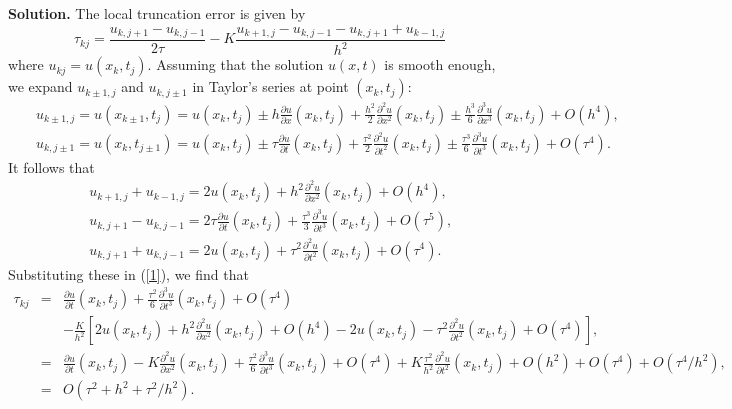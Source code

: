 \documentclass[10pt]{article}
\def\pr{{\partial}}
\begin{document}
\vskip 0.5cm \noindent
{\bf Solution.} The local truncation error is given by
\begin{equation}
\tau_{kj}=\frac{u_{k,j+1}-u_{k,j-1}}{2\tau}-K \frac{u_{k+1,j}
-u_{k,j-1}-u_{k,j+1}+u_{k-1,j}}{h^{2}}  \label{s1}
\end{equation}
where $u_{kj}=u(x_{k},t_{j})$. Assuming that the
solution $u(x,t)$ is smooth enough, we expand $u_{k\pm 1,j}$ and
$u_{k,j\pm 1}$ in Taylor's series at point $(x_{k},t_{j})$:
\begin{eqnarray}
&&u_{k\pm 1,j}=u(x_{k\pm 1},t_{j})=u(x_{k},t_{j})\pm h\frac{\pr
u}{\pr x}(x_{k},t_{j}) + \frac{h^{2}}{2}\frac{\pr^{2} u}{\pr
x^{2}}(x_{k},t_{j})\pm
\frac{h^{3}}{6}\frac{\pr^{3} u}{\pr x^{3}}(x_{k},t_{j}) +O(h^{4}), \nonumber \\
&&u_{k,j\pm 1}=u(x_{k},t_{j\pm 1})=u(x_{k},t_{j})\pm
\tau\frac{\pr u}{\pr t}(x_{k},t_{j}) + \frac{\tau^{2}}{2}\frac{\pr^{2}
u}{\pr t^{2}}(x_{k},t_{j})\pm \frac{\tau^{3}}{6}\frac{\pr^{3} u}{\pr
t^{3}}(x_{k},t_{j}) +O(\tau^{4}). \nonumber
\end{eqnarray}
It follows that
\begin{eqnarray}
&&u_{k+1,j}+u_{k-1,j}=2u(x_{k},t_{j})+h^2\frac{\pr^{2} u}{\pr
x^{2}}(x_{k},t_{j}) +O(h^{4}), \nonumber \\
&&u_{k,j+1}-u_{k,j-1}=2\tau\frac{\pr u}{\pr t}(x_{k},t_{j})
+\frac{\tau^{3}}{3}\frac{\pr^{3} u}{\pr t^{3}}(x_{k},t_{j}) +O(\tau^{5}), \nonumber \\
&&u_{k,j+1}+u_{k,j-1}=2u(x_{k},t_{j})+ \tau^{2}\frac{\pr^{2}
u}{\pr t^{2}}(x_{k},t_{j})+O(\tau^{4}). \nonumber
\end{eqnarray}
Substituting these in (\ref{1}), we find that
\begin{eqnarray}
\tau_{kj}&=&\frac{\pr u}{\pr t}(x_{k},t_{j})
+\frac{\tau^{2}}{6}\frac{\pr^{3} u}{\pr t^{3}}(x_{k},t_{j})
 +O(\tau^{4})  \nonumber \\
&&-\frac{K}{h^2}\left[2u(x_{k},t_{j})+h^2\frac{\pr^{2} u}{\pr
x^{2}}(x_{k},t_{j}) +O(h^{4})-
2u(x_{k},t_{j})- \tau^{2}\frac{\pr^{2}
u}{\pr t^{2}}(x_{k},t_{j})+O(\tau^{4})\right], \nonumber \\
&=&\frac{\pr u}{\pr t}(x_{k},t_{j})-K\frac{\pr^{2} u}{\pr
x^{2}}(x_{k},t_{j})+\frac{\tau^{2}}{6}\frac{\pr^{3} u}{\pr t^{3}}(x_{k},t_{j})
 +O(\tau^{4})+K\frac{\tau^{2}}{h^2}\frac{\pr^{2}
u}{\pr t^{2}}(x_{k},t_{j})+O(h^{2}) +O(\tau^{4})+O(\tau^4/h^2), \nonumber \\
&=&O(\tau^2+h^2+\tau^2/h^2). \nonumber
\end{eqnarray}
\end{document}
